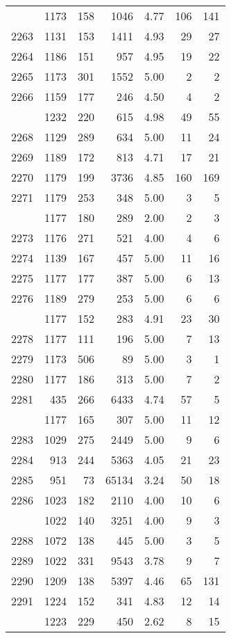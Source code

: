 \documentclass[
]{article}
\begin{document}
\begin{table}
\begin{tabular}[t]{lrrrrrr}
\addlinespace
2262 & 1173 & 158 & 1046 & 4.77 & 106 & 141\\
2263 & 1131 & 153 & 1411 & 4.93 & 29 & 27\\
2264 & 1186 & 151 & 957 & 4.95 & 19 & 22\\
2265 & 1173 & 301 & 1552 & 5.00 & 2 & 2\\
2266 & 1159 & 177 & 246 & 4.50 & 4 & 2\\
\addlinespace
2267 & 1232 & 220 & 615 & 4.98 & 49 & 55\\
2268 & 1129 & 289 & 634 & 5.00 & 11 & 24\\
2269 & 1189 & 172 & 813 & 4.71 & 17 & 21\\
2270 & 1179 & 199 & 3736 & 4.85 & 160 & 169\\
2271 & 1179 & 253 & 348 & 5.00 & 3 & 5\\
\addlinespace
2272 & 1177 & 180 & 289 & 2.00 & 2 & 3\\
2273 & 1176 & 271 & 521 & 4.00 & 4 & 6\\
2274 & 1139 & 167 & 457 & 5.00 & 11 & 16\\
2275 & 1177 & 177 & 387 & 5.00 & 6 & 13\\
2276 & 1189 & 279 & 253 & 5.00 & 6 & 6\\
\addlinespace
2277 & 1177 & 152 & 283 & 4.91 & 23 & 30\\
2278 & 1177 & 111 & 196 & 5.00 & 7 & 13\\
2279 & 1173 & 506 & 89 & 5.00 & 3 & 1\\
2280 & 1177 & 186 & 313 & 5.00 & 7 & 2\\
2281 & 435 & 266 & 6433 & 4.74 & 57 & 5\\
\addlinespace
2282 & 1177 & 165 & 307 & 5.00 & 11 & 12\\
2283 & 1029 & 275 & 2449 & 5.00 & 9 & 6\\
2284 & 913 & 244 & 5363 & 4.05 & 21 & 23\\
2285 & 951 & 73 & 65134 & 3.24 & 50 & 18\\
2286 & 1023 & 182 & 2110 & 4.00 & 10 & 6\\
\addlinespace
2287 & 1022 & 140 & 3251 & 4.00 & 9 & 3\\
2288 & 1072 & 138 & 445 & 5.00 & 3 & 5\\
2289 & 1022 & 331 & 9543 & 3.78 & 9 & 7\\
2290 & 1209 & 138 & 5397 & 4.46 & 65 & 131\\
2291 & 1224 & 152 & 341 & 4.83 & 12 & 14\\
\addlinespace
2292 & 1223 & 229 & 450 & 2.62 & 8 & 15\\

\end{tabular}
\end{table}
\end{document}
